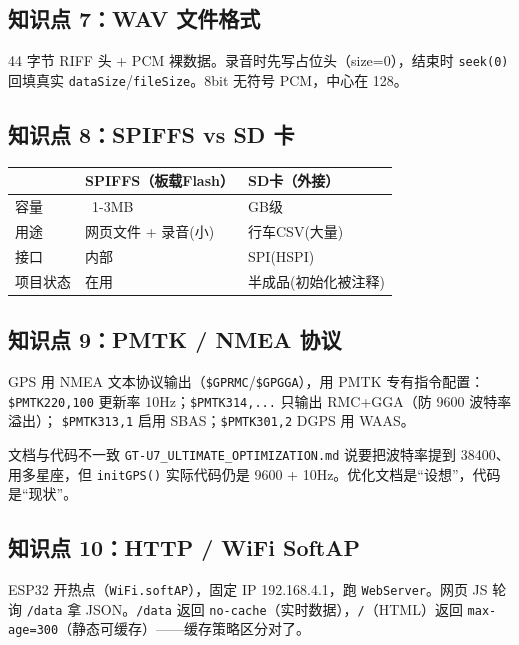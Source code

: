 \documentclass[UTF8,11pt,a4paper]{ctexart}
\begin{document}
\subsection{知识点 7：WAV 文件格式}
44 字节 RIFF 头 + PCM 裸数据。录音时先写占位头（size=0），结束时 \texttt{seek(0)} 回填真实
\texttt{dataSize}/\texttt{fileSize}。8bit 无符号 PCM，中心在 128。

\subsection{知识点 8：SPIFFS vs SD 卡}
\begin{center}\small
\begin{tabularx}{\linewidth}{@{}lXX@{}}
\toprule
 & \textbf{SPIFFS（板载Flash）} & \textbf{SD卡（外接）} \\
\midrule
容量 & ~1-3MB & GB级 \\
用途 & 网页文件 + 录音(小) & 行车CSV(大量) \\
接口 & 内部 & SPI(HSPI) \\
项目状态 & 在用 & 半成品(初始化被注释) \\
\bottomrule
\end{tabularx}
\end{center}

\subsection{知识点 9：PMTK / NMEA 协议}
GPS 用 NMEA 文本协议输出（\texttt{\$GPRMC}/\texttt{\$GPGGA}），用 PMTK 专有指令配置：
\texttt{\$PMTK220,100} 更新率 10Hz；\texttt{\$PMTK314,...} 只输出 RMC+GGA（防 9600 波特率溢出）；
\texttt{\$PMTK313,1} 启用 SBAS；\texttt{\$PMTK301,2} DGPS 用 WAAS。
\begin{warn}{文档与代码不一致}
\texttt{GT-U7\_ULTIMATE\_OPTIMIZATION.md} 说要把波特率提到 38400、用多星座，但 \texttt{initGPS()}
实际代码仍是 9600 + 10Hz。优化文档是“设想”，代码是“现状”。
\end{warn}

\subsection{知识点 10：HTTP / WiFi SoftAP}
ESP32 开热点（\texttt{WiFi.softAP}），固定 IP 192.168.4.1，跑 \texttt{WebServer}。网页 JS 轮询
\texttt{/data} 拿 JSON。\texttt{/data} 返回 \texttt{no-cache}（实时数据），\texttt{/}（HTML）返回
\texttt{max-age=300}（静态可缓存）——缓存策略区分对了。

\end{document}
